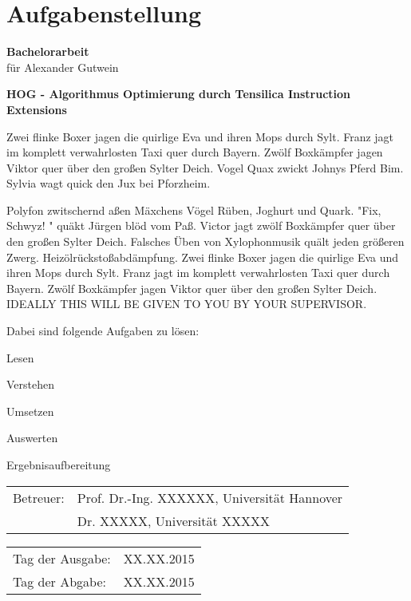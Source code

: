 \chapter*{Aufgabenstellung}

\textbf{Bachelorarbeit}\\
für Alexander Gutwein

\begin{center}
  \textbf{HOG - Algorithmus Optimierung durch Tensilica Instruction Extensions}
\end{center}
\medskip

\noindent Zwei flinke Boxer jagen die quirlige Eva und ihren Mops durch Sylt. Franz jagt im komplett verwahrlosten Taxi quer durch Bayern. Zwölf Boxkämpfer jagen Viktor quer über den großen Sylter Deich. Vogel Quax zwickt Johnys Pferd Bim. Sylvia wagt quick den Jux bei Pforzheim.

\noindent Polyfon zwitschernd aßen Mäxchens Vögel Rüben, Joghurt und Quark. "Fix, Schwyz! " quäkt Jürgen blöd vom Paß. Victor jagt zwölf Boxkämpfer quer über den großen Sylter Deich. Falsches Üben von Xylophonmusik quält jeden größeren Zwerg. Heizölrückstoßabdämpfung. Zwei flinke Boxer jagen die quirlige Eva und ihren Mops durch Sylt. Franz jagt im komplett verwahrlosten Taxi quer durch Bayern. Zwölf Boxkämpfer jagen Viktor quer über den großen Sylter Deich. IDEALLY THIS WILL BE GIVEN TO YOU BY YOUR SUPERVISOR.

\medskip
Dabei sind folgende Aufgaben zu lösen:
\begin{itemize*}
 \item Lesen
 \item Verstehen
 \item Umsetzen
 \item Auswerten
 \item Ergebnisaufbereitung
\end{itemize*}


\begin{flushleft}
\begin{tabular}{l l}
  Betreuer: & Prof. Dr.-Ing. XXXXXX, Universität Hannover\\
  					& Dr. XXXXX, Universität XXXXX\\
\end{tabular}

\vspace{0.3cm}

\begin{tabular}{l l}
  Tag der Ausgabe:& XX.XX.2015\\
  Tag der Abgabe:& XX.XX.2015
\end{tabular}
\end{flushleft}




